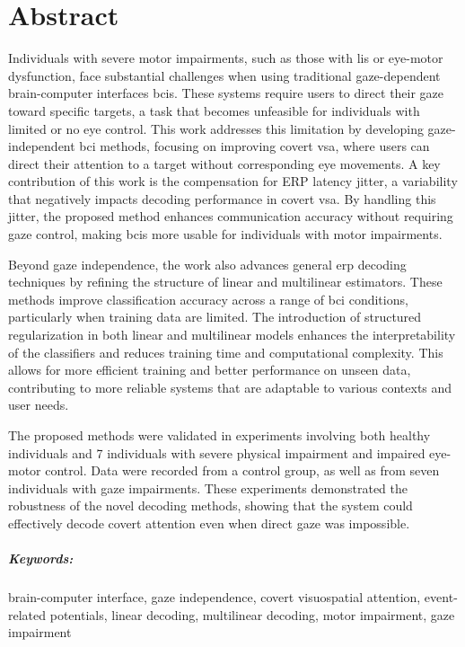 \chapter*{Abstract}
Individuals with severe motor impairments, such as those with \ac{lis}
or eye-motor dysfunction, face substantial challenges when using traditional
gaze-dependent brain-computer interfaces \acp{bci}.
These systems require users to direct their gaze toward specific targets, a
task that becomes unfeasible for individuals with limited or no eye control.
This work addresses this limitation by developing gaze-independent
\ac{bci} methods, focusing on improving covert \ac{vsa}, where users can direct
their attention to a target without corresponding eye movements.
A key contribution of this work is the compensation for ERP latency jitter, a
variability that negatively impacts decoding performance in covert \ac{vsa}.
By handling this jitter, the proposed method enhances communication accuracy
without requiring gaze control, making \acp{bci} more usable for individuals with
motor impairments.

Beyond gaze independence, the work also advances general \ac{erp} decoding
techniques by refining the structure of linear and multilinear estimators.
These methods improve classification accuracy across a range of \ac{bci}
conditions, particularly when training data are limited.
The introduction of structured regularization in both linear and multilinear
models enhances the interpretability of the classifiers and reduces training
time and computational complexity.
This allows for more efficient training and better performance on unseen data,
contributing to more reliable systems that are adaptable to various contexts and user needs.

The proposed methods were validated in experiments involving both healthy
individuals and 7 individuals with severe physical impairment and impaired eye-motor control.
Data were recorded from a control group, as well as from seven individuals with
gaze impairments.
These experiments demonstrated the robustness of the novel decoding methods,
showing that the system could effectively decode covert attention even when
direct gaze was impossible.

\paragraph{Keywords:} brain-computer interface, gaze independence, covert
visuospatial attention, event-related potentials, linear decoding, multilinear
decoding, motor impairment, gaze impairment
